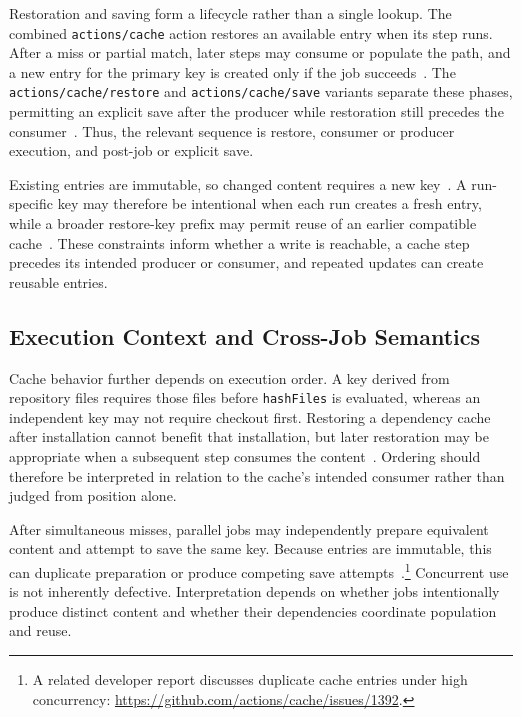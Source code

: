 \documentclass[smallextended]{svjour3}
\begin{document}
Restoration and saving form a lifecycle rather than a single lookup. The combined \texttt{actions/cache} action restores an available entry when its step runs. After a miss or partial match, later steps may consume or populate the path, and a new entry for the primary key is created only if the job succeeds~\citep{gha_cache_docs}. The \texttt{actions/cache/restore} and \texttt{actions/cache/save} variants separate these phases, permitting an explicit save after the producer while restoration still precedes the consumer~\citep{gha_cache_strategies}. Thus, the relevant sequence is restore, consumer or producer execution, and post-job or explicit save.

Existing entries are immutable, so changed content requires a new key~\citep{gha_cache_docs}. A run-specific key may therefore be intentional when each run creates a fresh entry, while a broader restore-key prefix may permit reuse of an earlier compatible cache~\citep{gha_cache_tips}. These constraints inform whether a write is reachable, a cache step precedes its intended producer or consumer, and repeated updates can create reusable entries.

\subsection{Execution Context and Cross-Job Semantics}

Cache behavior further depends on execution order. A key derived from repository files requires those files before \texttt{hashFiles} is evaluated, whereas an independent key may not require checkout first. Restoring a dependency cache after installation cannot benefit that installation, but later restoration may be appropriate when a subsequent step consumes the content~\citep{gha_cache_docs}. Ordering should therefore be interpreted in relation to the cache's intended consumer rather than judged from position alone.

After simultaneous misses, parallel jobs may independently prepare equivalent content and attempt to save the same key. Because entries are immutable, this can duplicate preparation or produce competing save attempts~\citep{gha_cache_docs}.\footnote{A related developer report discusses duplicate cache entries under high concurrency: \url{https://github.com/actions/cache/issues/1392}.} Concurrent use is not inherently defective. Interpretation depends on whether jobs intentionally produce distinct content and whether their dependencies coordinate population and reuse.
\end{document}
